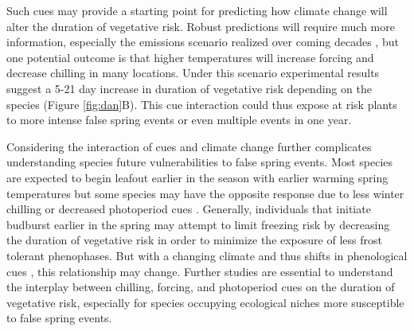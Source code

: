 \documentclass{article}\usepackage[]{graphicx}\usepackage[]{color}
\begin{document}
Such cues may provide a starting point for predicting how climate change will alter the duration of vegetative risk. Robust predictions will require much more information, especially the emissions scenario realized over coming decades \citep{IPCC2014}, but one potential outcome is that higher temperatures will increase forcing and decrease chilling in many locations. Under this scenario experimental results suggest a 5-21 day increase in duration of vegetative risk depending on the species (Figure \ref{fig:dan}B). 
This cue interaction could thus expose at risk plants to more intense false spring events or even multiple events in one year. 

Considering the interaction of cues and climate change further complicates understanding species future vulnerabilities to false spring events. Most species are expected to begin leafout earlier in the season with earlier warming spring temperatures but some species may have the opposite response due to less winter chilling or decreased photoperiod cues \citep{Cleland2006, Yu2010, Xin2016}. %
Generally, individuals that initiate budburst earlier in the spring may attempt to limit freezing risk by decreasing the duration of vegetative risk in order to minimize the exposure of less frost tolerant phenophases. But with a changing climate and thus shifts in phenological cues %
, this relationship may change. Further studies are essential to understand the interplay between chilling, forcing, and photoperiod cues on the duration of vegetative risk, especially for species occupying ecological niches more susceptible to false spring events. 


\end{document}

